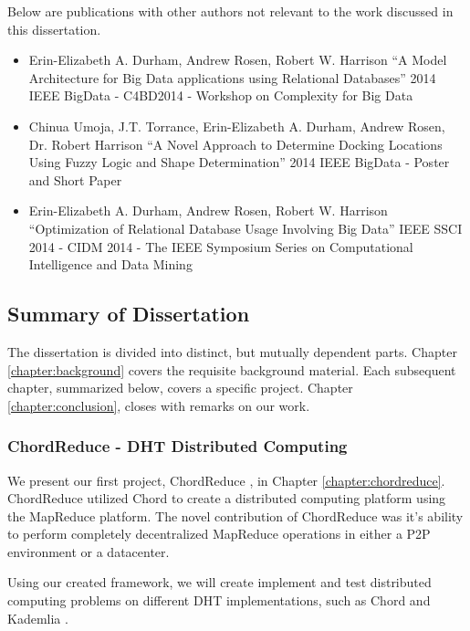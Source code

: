 Below are publications with other authors not relevant to the work discussed in this dissertation.
\begin{itemize}
	\item  Erin-Elizabeth A. Durham, Andrew Rosen, Robert W. Harrison
	``A Model Architecture for Big Data applications using Relational Databases''
	2014 IEEE BigData - C4BD2014 - Workshop on Complexity for Big Data  \cite{durham2014model}
	\item Chinua Umoja, J.T. Torrance, Erin-Elizabeth A. Durham, Andrew Rosen, Dr. Robert Harrison
	``A Novel Approach to Determine Docking Locations Using Fuzzy Logic and Shape Determination''
	2014 IEEE BigData - Poster and Short Paper \cite{umoja2014novel}
	\item  Erin-Elizabeth A. Durham, Andrew Rosen, Robert W. Harrison
	``Optimization of Relational Database Usage Involving Big Data'' 
	IEEE SSCI 2014 - CIDM 2014 - The IEEE Symposium Series on Computational Intelligence and Data Mining \cite{durham2014optimization}
\end{itemize}



\subsection{Summary of Dissertation}


The dissertation is divided into distinct, but mutually dependent parts.
Chapter \ref{chapter:background} covers the requisite background material.
Each subsequent chapter, summarized below, covers a specific project.
Chapter \ref{chapter:conclusion}, closes with remarks on our work.



\subsubsection{ChordReduce - DHT Distributed Computing}
We present our first project, ChordReduce \cite{chordreduce}, in Chapter \ref{chapter:chordreduce}.
ChordReduce utilized Chord \cite{chord} to create a distributed computing platform using the MapReduce \cite{mapreduce} platform.
The novel contribution of ChordReduce was it's ability to perform completely decentralized MapReduce operations in either a P2P environment or a datacenter.

Using our created framework, we will create implement and test distributed computing problems on different DHT implementations, such as Chord \cite{chord} and Kademlia \cite{kademlia}.


